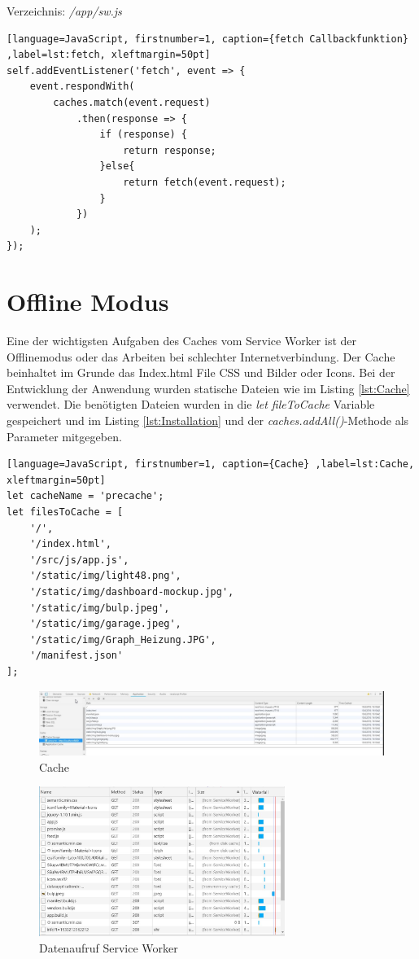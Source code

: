 Verzeichnis: \textit{/app/sw.js}

\begin{lstlisting}[language=JavaScript, firstnumber=1, caption={fetch Callbackfunktion} ,label=lst:fetch, xleftmargin=50pt]
self.addEventListener('fetch', event => {
    event.respondWith(
        caches.match(event.request)
            .then(response => {
                if (response) {
                    return response;
                }else{
                    return fetch(event.request);
                }
            })
    );
});
\end{lstlisting}


	 
\clearpage
\section{Offline Modus}
Eine der wichtigsten Aufgaben des Caches vom Service Worker ist der Offlinemodus oder das Arbeiten bei schlechter Internetverbindung. Der Cache beinhaltet im Grunde das Index.html File CSS und Bilder oder Icons. Bei der Entwicklung der Anwendung wurden statische Dateien wie im Listing \ref{lst:Cache} verwendet. Die benötigten Dateien wurden in die \textit{let fileToCache} Variable gespeichert und im Listing \ref{lst:Installation} und der \textit{caches.addAll()}-Methode als Parameter mitgegeben.


\begin{lstlisting}[language=JavaScript, firstnumber=1, caption={Cache} ,label=lst:Cache, xleftmargin=50pt]
let cacheName = 'precache';
let filesToCache = [
    '/',
    '/index.html',
    '/src/js/app.js',
    '/static/img/light48.png',
    '/static/img/dashboard-mockup.jpg',
    '/static/img/bulp.jpeg',
    '/static/img/garage.jpeg',
    '/static/img/Graph_Heizung.JPG',
    '/manifest.json'
];
\end{lstlisting}


\begin{figure}[H]
	\centering
	\includegraphics[width=16cm]{BilderAllgemein/Implementierung/Cache.jpg}\medskip
	\caption{Cache}
	\label{fig:Cache}
\end{figure}  

\begin{figure}[H]
	\centering
	\includegraphics[width=8cm]{BilderAllgemein/Implementierung/aufruf_SW_Browser.jpg}\medskip
	\caption{Datenaufruf Service Worker}
	\label{fig:aufrufSWBrowser}
\end{figure}  

